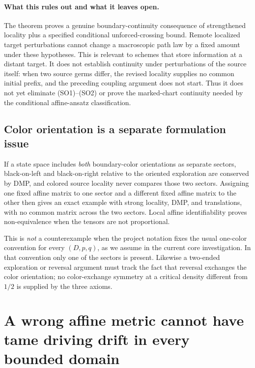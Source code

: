 \documentclass[11pt]{article}
\theoremstyle{definition}\newtheorem{definition}[theorem]{Definition}
\theoremstyle{remark}\newtheorem{remark}[theorem]{Remark}
\begin{document}
\paragraph{What this rules out and what it leaves open.}
The theorem proves a genuine boundary-continuity consequence of strengthened
locality plus a specified conditional unforced-crossing bound.  Remote
localized target perturbations cannot change a macroscopic path law by a
fixed amount under these hypotheses.  This is relevant to schemes that
store information at a distant target.  It does not establish continuity
under perturbations of the source itself: when two source germs differ,
the revised locality supplies no common initial prefix, and the preceding
coupling argument does not start.  Thus it does not yet eliminate (SO1)--(SO2)
or prove the marked-chart continuity needed by the conditional affine-ansatz
classification.

\subsection{Color orientation is a separate formulation issue}

If a state space includes \emph{both} boundary-color orientations as separate
sectors, black-on-left and black-on-right relative to the oriented
exploration are conserved by DMP, and colored source locality never compares
those two sectors.  Assigning one fixed affine matrix to one sector and a
different fixed affine matrix to the other then gives an exact example with
strong locality, DMP, and translations, with no common matrix across the two
sectors.  Local affine identifiability proves non-equivalence when the tensors
are not proportional.

This is \emph{not} a counterexample when the project notation fixes the usual
one-color convention for every $(D,p,q)$, as we assume in the current core
investigation.  In that convention only one of the sectors is present.
Likewise a two-ended exploration or reversal argument must track the fact
that reversal exchanges the color orientation; no color-exchange symmetry
at a critical density different from $1/2$ is supplied by the three axioms.

\section{A wrong affine metric cannot have tame driving drift in every bounded domain}
\label{sec:scaling-semimartingale}
\end{document}
